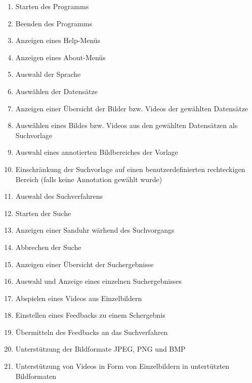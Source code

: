 \begin{enumerate} [label=\bfseries /F \arabic*0/]
	\subsection{Pflicht}
	\item Starten des Programms
	\item Beenden des Programms
	\item Anzeigen eines Help-Menüs
	\item Anzeigen eines About-Menüs
	\item Auswahl der Sprache
	\newline
	\item Ausw\"ahlen der Datens\"atze
	\item Anzeigen einer Übersicht der Bilder bzw. Videos der gewählten Datensätze
	\item Ausw\"ahlen eines Bildes bzw. Videos aus den gewählten Datensätzen als Suchvorlage
	\item Auswahl eines annotierten Bildbereiches der Vorlage
	\item Einschränkung der Suchvorlage auf einen benutzerdefinierten rechteckigen Bereich (falls keine Annotation gewählt wurde)
	\item Auswahl des Suchverfahrens
	\newline
	\item Starten der Suche
	\item Anzeigen einer Sanduhr w\"arhend des Suchvorgangs
	\item Abbrechen der Suche
	\newline
	\item Anzeigen einer \"Ubersicht der Suchergebnisse
	\item Auswahl und Anzeige eines einzelnen Suchergebnisses
	\item Abspielen eines Videos aus Einzelbildern
	\item Einstellen eines Feedbacks zu einem Schergebnis
	\item \"Ubermitteln des Feedbacks an das Suchverfahren
	\newline
	\item Unterstützung der Bildformate JPEG, PNG und BMP
	\item Unterstützung von Videos in Form von Einzelbildern in untert\"utzten Bildformaten


\end{enumerate}
